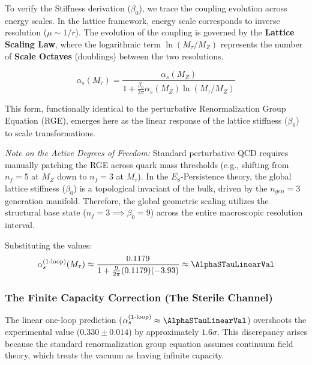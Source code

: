 To verify the Stiffness derivation ($\beta_0$), we trace the coupling evolution across energy scales. In the lattice framework, energy scale corresponds to inverse resolution ($\mu \sim 1/r$). The evolution of the coupling is governed by the \textbf{Lattice Scaling Law}, where the logarithmic term $\ln(M_\tau/M_Z)$ represents the number of \textbf{Scale Octaves} (doublings) between the two resolutions.

\begin{equation}
\alpha_s(M_\tau) = \frac{\alpha_s(M_Z)}{1 + \frac{\beta_0}{2\pi} \alpha_s(M_Z) \ln(M_\tau/M_Z)}
\end{equation}

This form, functionally identical to the perturbative Renormalization Group Equation (RGE), emerges here as the linear response of the lattice stiffness ($\beta_0$) to scale transformations.

\textit{Note on the Active Degrees of Freedom:} Standard perturbative QCD requires manually patching the RGE across quark mass thresholds (e.g., shifting from $n_f=5$ at $M_Z$ down to $n_f=3$ at $M_\tau$). In the $E_8$-Persistence theory, the global lattice stiffness ($\beta_0$) is a topological invariant of the bulk, driven by the $n_{gen}=3$ generation manifold. Therefore, the global geometric scaling utilizes the structural base state ($n_f = 3 \implies \beta_0 = 9$) across the entire macroscopic resolution interval. 

Substituting the values:
\begin{equation}
\alpha_s^{\text{(1-loop)}}(M_\tau) \approx \frac{0.1179}{1 + \frac{9}{2\pi}(0.1179)(-3.93)} \approx \AlphaSTauLinearVal
\end{equation}


\subsubsection{The Finite Capacity Correction (The Sterile Channel)}

The linear one-loop prediction ($\alpha_s^{\text{(1-loop)}} \approx \AlphaSTauLinearVal$) overshoots the experimental value ($0.330 \pm 0.014$) by approximately $1.6\sigma$. This discrepancy arises because the standard renormalization group equation assumes continuum field theory, which treats the vacuum as having infinite capacity.

